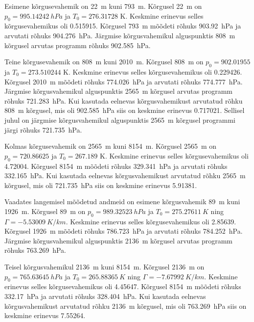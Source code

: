 \documentclass{trkut}%
\begin{document}
Esimene kõrgusevahemik on \SI{22}{m} kuni \SI{793}{m}. Kõrgusel \SI{22}{m} on $p_0=\SI{995.14242}{hPa}$ ja $T_0 = 276.31728$ K. Keskmine erinevus selles kõrgusevahemikus oli \SI{0.515915}{\permil}. Kõrgusel \SI{793}{m} mõõdeti rõhuks \SI{903.92}{hPa} ja arvutati rõhuks \SI{904.276}{hPa}. Järgmise kõrgusvahemikul alguspunktis \SI{808}{m} kõrgusel arvutas programm rõhuks \SI{902.585}{hPa}.

Teine kõrgusevahemik on \SI{808}{m} kuni \SI{2010}{m}. Kõrgusel \SI{808}{m} on $p_0 = 902.01955$ ja $T_0 = 273.510244$ K. Keskmine erinevus selles kõrgusevahemikus oli \SI{0.229426}{\permil}. Kõrgusel \SI{2010}{m} mõõdeti rõhuks \SI{774.026}{hPa} ja arvutati rõhuks \SI{774.777}{hPa}. Järgmise kõrgusvahemikul alguspunktis \SI{2565}{m} kõrgusel arvutas programm rõhuks \SI{721.283}{hPa}. Kui kasutada eelnevas kõrgusvahemikust arvutatud rõhku \SI{808}{m} kõrgusel, mis oli \SI{902.585}{hPa} siis on keskmine erinevus \SI{0.717021}{\permil}. Sellisel juhul on järgmise kõrgusvahemikul alguspunktis \SI{2565}{m} kõrgusel programmi järgi rõhuks \SI{721.735}{hPa}.

Kolmas kõrgusevahemik on \SI{2565}{m} kuni \SI{8154}{m}. Kõrgusel \SI{2565}{m} on $p_0 = 720.86625$ ja $T_0 = 267.189$ K. Keskmine erinevus selles kõrgusevahemikus oli \SI{4.72004}{\permil}. Kõrgusel \SI{8154}{m} mõõdeti rõhuks \SI{329.341}{hPa} ja arvutati rõhuks \SI{332.165}{hPa}. Kui kasutada eelnevas kõrgusvahemikust arvutatud rõhku \SI{2565}{m} kõrgusel, mis oli \SI{721.735}{hPa} siis on keskmine erinevus \SI{5.91381}{\permil}.

Vaadates langemisel mõõdetud andmeid on esimene kõrgusvahemik \SI{89}{m} kuni \SI{1926}{m}. Kõrgusel \SI{89}{m} on $p_0=\SI{989.32523}{hPa}$ ja $T_0 = \SI{275.27611}{K}$ ning $\Gamma = \SI{-5.53009}{K/km}$. Keskmine erinevus selles kõrgusevahemikus oli \SI{2.85639}{\permil}. Kõrgusel \SI{1926}{m} mõõdeti rõhuks \SI{786.723}{hPa} ja arvutati rõhuks \SI{784.252}{hPa}. Järgmise kõrgusvahemikul alguspunktis \SI{2136}{m} kõrgusel arvutas programm rõhuks \SI{763.269}{hPa}.

Teisel kõrgusvahemikul \SI{2136}{m} kuni \SI{8154}{m}. Kõrgusel \SI{2136}{m} on $p_0=\SI{765.63645}{hPa}$ ja $T_0 = \SI{265.88365}{K}$ ning $\Gamma = \SI{-7.67992}{K/km}$. Keskmine erinevus selles kõrgusevahemikus oli \SI{4.45647}{\permil}. Kõrgusel \SI{8154}{m} mõõdeti rõhuks \SI{332.17}{hPa} ja arvutati rõhuks \SI{328.404}{hPa}. Kui kasutada eelnevas kõrgusvahemikust arvutatud rõhku \SI{2136}{m} kõrgusel, mis oli \SI{763.269}{hPa} siis on keskmine erinevus \SI{7.55264}{\permil}.
\end{document}
